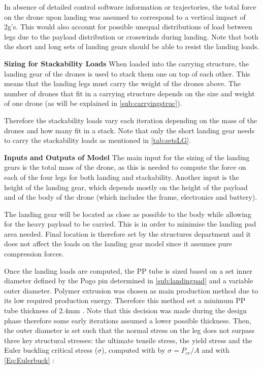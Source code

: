In absence of detailed control software information or trajectories, the total force on the drone upon landing was assumed to correspond to a vertical impact of 2g's. This would also account for possible unequal distributions of load between legs due to the payload distribution or crosswinds during landing. Note that both the short and long sets of landing gears should be able to resist the landing loads.

\textbf{Sizing for Stackability Loads} \newline
When loaded into the carrying structure, the landing gear of the drones is used to stack them one on top of each other. This means that the landing legs must carry the weight of the drones above. The number of drones that fit in a carrying structure depends on the size and weight of one drone (as will be explained in \autoref{sub:carryingstruc}).

Therefore the stackability loads vary each iteration depending on the mass of the drones and how many fit in a stack. Note that only the short landing gear needs to carry the stackability loads as mentioned in \autoref{tab:setsLG}.

\textbf{Inputs and Outputs of Model} \newline
The main input for the sizing of the landing gears is the total mass of the drone, as this is needed to compute the force on each of the four legs for both landing and stackability. Another input is the height of the landing gear, which depends mostly on the height of the payload and of the body of the drone (which includes the frame, electronics and battery). 


The landing gear will be located as close as possible to the body while allowing for the heavy payload to be carried. This is in order to minimise the landing pad area needed. Final location is therefore set by the structures department and it does not affect the loads on the landing gear model since it assumes pure compression forces.


Once the landing loads are computed, the PP tube is sized based on a set inner diameter defined by the Pogo pin determined in \autoref{sub:landingpad} and a variable outer diameter. Polymer extrusion was chosen as main production method due to its low required production energy. Therefore this method set a minimum PP tube thickness of 2.4mm \cite{ppThickness}. Note that this decision was made during the design phase therefore some early iterations assumed a lower possible thickness. Then, the outer diameter is set such that the normal stress on the leg does not surpass three key structural stresses: the ultimate tensile stress, the yield stress and the Euler buckling critical stress ($\sigma$), computed with by $\sigma = P_{cr}/A$ and with \autoref{Eq:Eulerbuck} \cite{SAD}:

